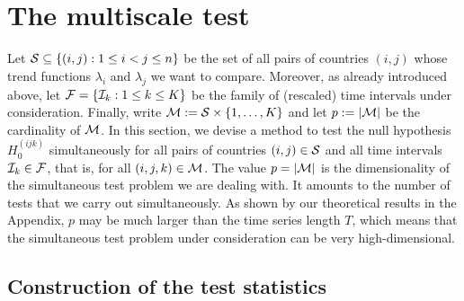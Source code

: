 \documentclass[a4paper,12pt]{article}
\numberwithin{equation}{section}
\begin{document}
 

\section{The multiscale test}\label{sec:test}


Let $\mathcal{S} \subseteq \{ (i,j): 1 \le i < j \le n \}$ be the set of all pairs of countries $(i,j)$ whose trend functions $\lambda_i$ and $\lambda_j$ we want to compare. Moreover, as already introduced above, let $\mathcal{F} = \{ \mathcal{I}_k: 1 \le k \le K \}$ be the family of (rescaled) time intervals under consideration. Finally, write $\mathcal{M} := \mathcal{S} \times \{1,\ldots,K\}$ and let $p := |\mathcal{M}|$ be the cardinality of $\mathcal{M}$. In this section, we devise a method to test the null hypothesis $H_0^{(ijk)}$ simultaneously for all pairs of countries $(i,j) \in \mathcal{S}$ and all time intervals $\mathcal{I}_k \in \mathcal{F}$, that is, for all $(i,j,k) \in \mathcal{M}$. The value $p = |\mathcal{M}|$ is the dimensionality of the simultaneous test problem we are dealing with. It amounts to the number of tests that we carry out simultaneously. As shown by our theoretical results in the Appendix, $p$ may be much larger than the time series length $T$, which means that the simultaneous test problem under consideration can be very high-dimensional. 


\subsection{Construction of the test statistics}\label{subsec:test:test}
\end{document}
